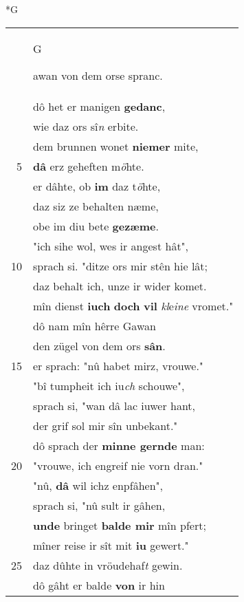 \documentclass[8pt,a4paper,notitlepage]{article}
\begin{document}
\begin{table}[ht]
\begin{minipage}[t]{0.5\linewidth}
\small
\begin{center}*G
\end{center}
\begin{tabular}{rl}
 & \begin{large}G\end{large}awan von dem orse spranc.\\ 
 & dô het er manigen \textbf{gedanc},\\ 
 & wie daz ors sî\textit{n} erbite.\\ 
 & dem brunnen wonet \textbf{niemer} mite,\\ 
5 & \textbf{dâ} erz geheften m\textit{ö}hte.\\ 
 & er dâhte, ob \textbf{im} daz t\textit{ö}hte,\\ 
 & daz siz ze behalten næme,\\ 
 & obe im diu bete \textbf{gezæme}.\\ 
 & "ich sihe wol, wes ir angest hât",\\ 
10 & sprach si. "ditze ors mir stên hie lât;\\ 
 & daz behalt ich, unze ir wider komet.\\ 
 & mîn dienst \textbf{iuch} \textbf{doch} \textbf{vil} \textit{kl}e\textit{ine} vromet."\\ 
 & dô nam mîn hêrre Gawan\\ 
 & den zügel von dem ors \textbf{sân}.\\ 
15 & er sprach: "nû habet mirz, vrouwe."\\ 
 & "bî tumpheit ich iu\textit{ch} schouwe",\\ 
 & sprach si, "wan dâ lac iuwer hant,\\ 
 & der grif sol mir sîn unbekant."\\ 
 & dô sprach der \textbf{minne gernde} man:\\ 
20 & "vrouwe, ich engreif nie vorn dran."\\ 
 & "nû, \textbf{dâ} wil ichz enpfâhen",\\ 
 & sprach si, "nû sult ir gâhen,\\ 
 & \textbf{unde} bringet \textbf{balde mir} mîn pfert;\\ 
 & mîner reise ir sît mit \textbf{iu} gewert."\\ 
25 & daz dûhte in vröudehaf\textit{t} gewin.\\ 
 & dô gâht er balde \textbf{von} ir hin\\ 

\end{tabular}
\end{minipage}
\end{table}
\end{document}
